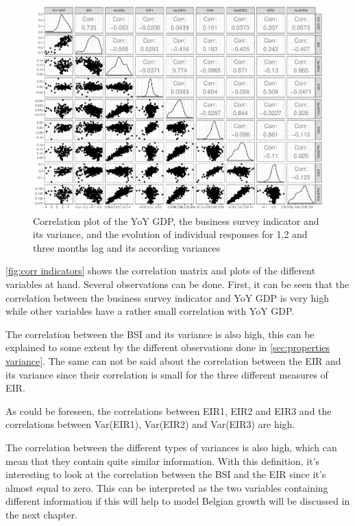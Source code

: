 \documentclass[12pt,a4paper,oneside]{book}
\begin{document}
\begin{figure}[H]
    \centering
    \includegraphics[scale=0.5]{Graphs/corr_indicators.pdf}
    \caption{Correlation plot of the YoY GDP, the business survey indicator and its variance, and the evolution of individual responses for 1,2 and three months lag and its according variances}
    \label{fig:corr indicators}
\end{figure}

\autoref{fig:corr indicators} shows the correlation matrix and plots of the different variables at hand. 
Several observations can be done.
First, it can be seen that the correlation between the business survey indicator and YoY GDP is very high while other variables have a rather small correlation with YoY GDP.

The correlation between the BSI and its variance is also high, this can be explained to some extent by the different observations done in \autoref{sec:properties variance}.
The same can not be said about the correlation between the EIR and its variance since their correlation is small for the three different measures of EIR.

As could be foreseen, the correlations between EIR1, EIR2 and EIR3 and the correlations between Var(EIR1), Var(EIR2) and Var(EIR3) are high.

The correlation between the different types of variances is also high, which can mean that they contain quite similar information.
With this definition, it's interesting to look at the correlation between the BSI and the EIR since it's almost equal to zero. This can be interpreted as the two variables containing different information if this will help to model Belgian growth will be discussed in the next chapter.
\end{document}
